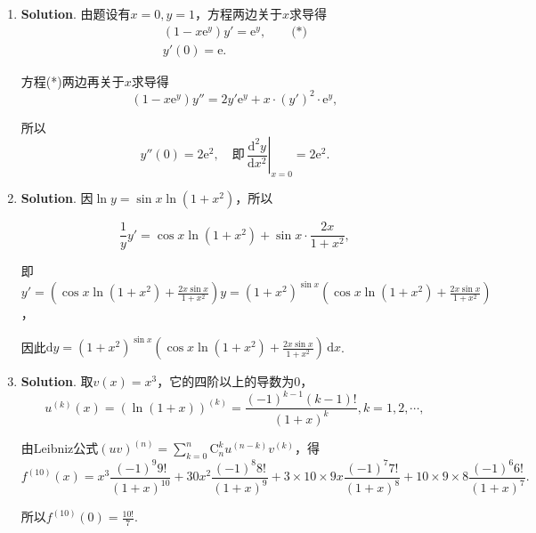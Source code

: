 \documentclass[../Main.tex]{subfiles}
\begin{document}
\begin{enumerate}
          所以$y'(x)=\frac{-\frac{2x}{2\sqrt{1-x^{2}}}\cdot x-(1-\sqrt{1-x^{2}})}{x^{2}}
              =\frac{1-\sqrt{1-x^{2}}}{x^{2}\sqrt{1-x^2}}$.

    \item \textbf{Solution}. 由题设有$x=0,y=1$，方程两边关于$x$求导得
          \[
              \begin{gathered}
                  (1-x\mathrm{e}^y)y'=\mathrm{e}^y,\qquad\text{(*)} \\
                  y'(0)=\mathrm{e}.
              \end{gathered}
          \]

          方程(*)两边再关于$x$求导得
          \[
              (1-x\mathrm{e}^{y})y''=2y'\mathrm{e}^{y}+x\cdot(y')^{2}\cdot\mathrm{e}^{y}
              ,
          \]

          所以
          \[
              y''(0)=2\mathrm{e}^{2},\quad\text{即}\,\left.\frac{\mathrm{d}^{2} y}{\mathrm{d}x^{2}}
              \right|_{x=0}=2\mathrm{e}^{2}.
          \]

    \item \textbf{Solution}. 因$\ln y=\sin x\ln(1+x^{2})$，所以

          \[
              \frac{1}{y}y'=\cos x\ln(1+x^{2})+\sin x\cdot\frac{2x}{1+x^{2}},
          \]

          即$y'=\left(\cos x\ln(1+x^{2})+\frac{2x\sin x}{1+x^{2}}\right)y=(1+x^{2})^{\sin
                      x}\left(\cos x\ln(1+x^{2})+\frac{2x\sin x}{1+x^{2}}\right)$，

          因此$\mathrm{d}y=(1+x^{2})^{\sin x}\left(\cos x\ln(1+x^{2})+\frac{2x\sin x}{1+x^{2}}
              \right)\,\mathrm{d}x$.

    \item \textbf{Solution}. 取$v(x)=x^{3}$，它的四阶以上的导数为0，
          \[
              u^{(k)}(x)=\left(\ln(1+x)\right)^{(k)}=\frac{(-1)^{k-1}(k-1)!}{(1+x)^{k}}
              ,k=1,2,\cdots,
          \]

          由Leibniz公式$(uv)^{(n)}=\sum_{k=0}^{n}\mathrm{C}_{n}^{k}u^{(n-k)}v^{(k)}$，得
          \[
              f^{(10)}(x)=x^{3}\frac{(-1)^{9} 9!}{(1+x)^{10}}+30x^{2}\frac{(-1)^{8} 8!}{(1+x)^{9}}
              +3\times10\times9x\frac{(-1)^{7} 7!}{(1+x)^{8}}+10\times9\times8\frac{(-1)^{6}
                  6!}{(1+x)^{7}}.
          \]

          所以$f^{(10)}(0)=\frac{10!}{7}$.


\end{enumerate}
\end{document}
